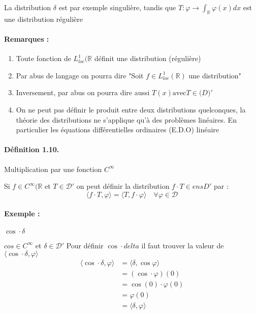 \documentclass[12pt,a4paper]{report}
\newcommand{\Ens}[1]{\mathbb{#1}}
\newcommand{\ens}[1]{\mathbb{#1}}
\newcommand{\D}{\ensuremath{\mathcal{D}}}
\begin{document}
La distribution \(\delta\) est par exemple singulière, tandis que \(T : \varphi \rightarrow \int_{\Ens{R}} \varphi(x) dx\) est une distribution régulière

\paragraph{Remarques :}
\begin{enumerate}
	\item Toute fonction de \(L^1_{loc}(\ens{R}\) définit une distribution (régulière)
	\item Par abus de langage on pourra dire "Soit \(f \in L^1_{loc} (\ens{R})\) une distribution"
	\item Inversement, par abus on pourra dire aussi \(T(x) \text{avec} T \in \ens(D)'\)
	\item On ne peut pas définir le produit entre deux distributions quelconques, la théorie des distributions ne s'applique qu'à des problèmes linéaires. En particulier les équations différentielles ordinaires (E.D.O) linéaire
\end{enumerate}

\paragraph{Définition 1.10.} Multiplication par une fonction \(C^{\infty}\)

Si \(f \in C^{\infty}(\ens{R} \) et \(T\in \D'\) on peut définir la distribution \(f\cdot T \in ens{D}'\) par :
\[
	\langle f\cdot T, \varphi \rangle = \langle T, f\cdot \varphi \rangle \quad \forall \varphi \in \D
\]

\paragraph{Exemple :} \(\cos \cdot \delta\)

\(cos \in C^{\infty}\) et \(\delta \in \D'\)
Pour définir \(\cos \cdot delta\) il faut trouver la valeur de \(\langle \cos \cdot \delta, \varphi \rangle\)
\begin{align*}
	\langle \cos \cdot \delta, \varphi \rangle &= \langle \delta, \cos \varphi \rangle\\
	&= (\cos \cdot \varphi)(0)\\
	&= \cos(0) \cdot \varphi(0)\\
	&= \varphi (0)\\
	&= \langle \delta, \varphi \rangle
\end{align*}
\end{document}
